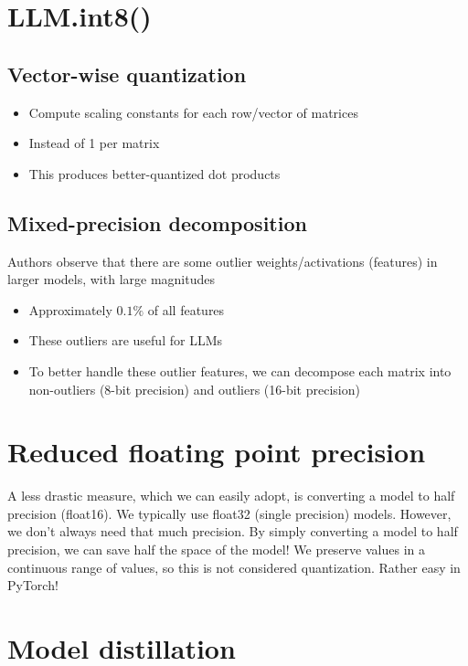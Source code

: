 \section{LLM.int8()}

\subsection{Vector-wise quantization}

\begin{itemize}
  \item Compute scaling constants for each row/vector of matrices
  \item Instead of 1 per matrix
  \item This produces better-quantized dot products
\end{itemize}


\subsection{Mixed-precision decomposition}

Authors observe that there are some outlier
weights/activations (features) in larger models, with large
magnitudes

\begin{itemize}
  \item Approximately $0.1\%$ of all features
  \item These outliers are useful for LLMs
  \item To better handle these outlier features, we can decompose each matrix into non-outliers (8-bit precision) and outliers (16-bit precision)
\end{itemize}

\section{Reduced floating point precision}


A less drastic measure, which we can easily adopt, is converting a
model to half precision (float16). We typically use float32 (single precision) models. However, we don't always need that much precision. By simply converting a model to half precision, we can save half the
space of the model!
We preserve values in a continuous range of values, so this is not
considered quantization. Rather easy in PyTorch!

\section{Model distillation}

